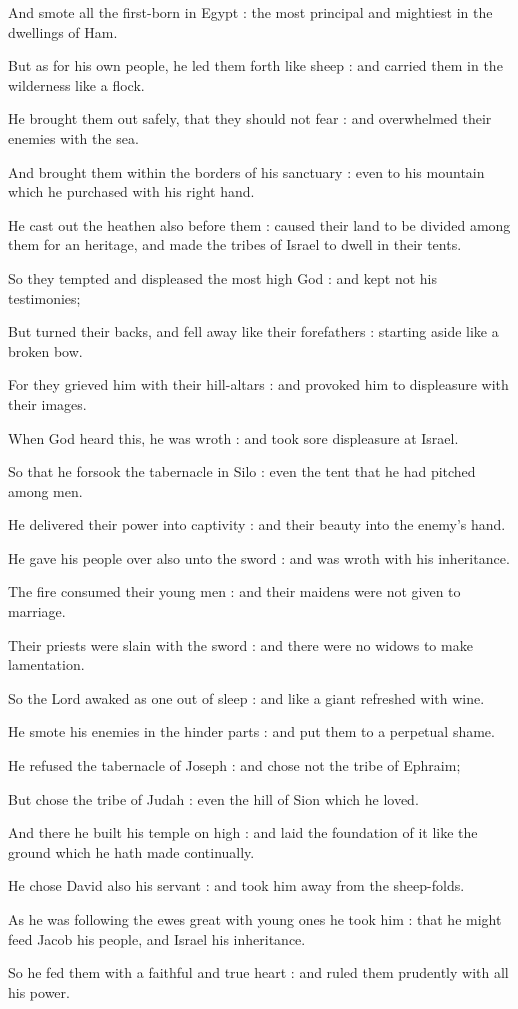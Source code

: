 And smote all the first-born in Egypt : the most principal and mightiest in the dwellings of Ham.\par
{}But as for his own people, he led them forth like sheep : and carried them in the wilderness like a flock.\par
{}He brought them out safely, that they should not fear : and overwhelmed their enemies with the sea.\par
{}And brought them within the borders of his sanctuary : even to his mountain which he purchased with his right hand.\par
{}He cast out the heathen also before them : caused their land to be divided among them for an heritage, and made the tribes of Israel to dwell in their tents.\par
{}So they tempted and displeased the most high God : and kept not his testimonies;\par
{}But turned their backs, and fell away like their forefathers : starting aside like a broken bow.\par
{}For they grieved him with their hill-altars : and provoked him to displeasure with their images.\par
{}When God heard this, he was wroth : and took sore displeasure at Israel.\par
{}So that he forsook the tabernacle in Silo : even the tent that he had pitched among men.\par
{}He delivered their power into captivity : and their beauty into the enemy's hand.\par
{}He gave his people over also unto the sword : and was wroth with his inheritance.\par
{}The fire consumed their young men : and their maidens were not given to marriage.\par
{}Their priests were slain with the sword : and there were no widows to make lamentation.\par
{}So the Lord awaked as one out of sleep : and like a giant refreshed with wine.\par
{}He smote his enemies in the hinder parts : and put them to a perpetual shame.\par
{}He refused the tabernacle of Joseph : and chose not the tribe of Ephraim;\par
{}But chose the tribe of Judah : even the hill of Sion which he loved.\par
{}And there he built his temple on high : and laid the foundation of it like the ground which he hath made continually.\par
{}He chose David also his servant : and took him away from the sheep-folds.\par
{}As he was following the ewes great with young ones he took him : that he might feed Jacob his people, and Israel his inheritance.\par
{}So he fed them with a faithful and true heart : and ruled them prudently with all his power.\par

